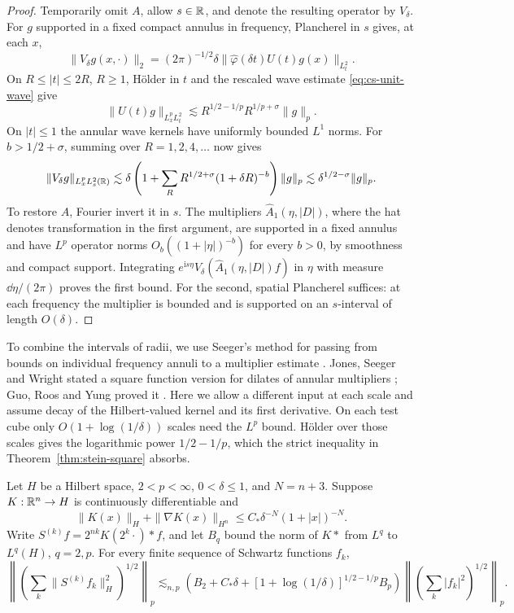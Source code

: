 \begin{proof}
Temporarily omit \(A\), allow \(s\in\mathbb R\), and denote the resulting
operator by \(V_\delta\). For \(g\) supported in a fixed compact
annulus in frequency, Plancherel in \(s\) gives, at each \(x\),
\[
 \|V_\delta g(x,\cdot)\|_2
   =(2\pi)^{-1/2}\delta
          \|\widehat\varphi(\delta t) U(t)g(x)\|_{L^2_t}.
\]
On \(R\le |t|\le 2R\), \(R\ge1\), H\"older in \(t\) and the rescaled
wave estimate \eqref{eq:cs-unit-wave} give
\[
 \|U(t)g\|_{L^p_xL^2_t}
 \lesssim R^{1/2-1/p}R^{1/p+\sigma}\|g\|_p.
\]
On \(|t|\le1\) the annular wave kernels have uniformly bounded
\(L^1\) norms. For \(b>1/2+\sigma\), summing over \(R=1,2,4,\ldots\)
now gives
\[
 \|V_\delta g\|_{L^p_x L^2_s(\mathbb R)}
 \lesssim \delta\left(1+\sum_R R^{1/2+\sigma}(1+\delta R)^{-b}\right)
             \|g\|_p
 \lesssim \delta^{1/2-\sigma}\|g\|_p .
\]
To restore \(A\), Fourier invert it in \(s\). The multipliers
\(\widehat A_1(\eta,|D|)\), where the hat denotes transformation in
the first argument, are supported in a fixed annulus and have \(L^p\)
operator norms \(O_b((1+|\eta|)^{-b})\) for every \(b>0\), by smoothness
and compact support. Integrating
\(e^{\mathrm is\eta}V_\delta(\widehat A_1(\eta,|D|)f)\) in \(\eta\)
with measure \(\dd\eta/(2\pi)\) proves the first bound. For the second,
spatial Plancherel suffices: at each frequency the multiplier is bounded
and is supported on an \(s\)-interval of length \(O(\delta)\).
\end{proof}

To combine the intervals of radii, we use Seeger's method for passing
from bounds on individual frequency annuli to a multiplier estimate
\cite[Theorem~1]{Seeger1988Dilates}. Jones, Seeger and Wright stated
a square function version for dilates of annular multipliers
\cite[p.~6737]{JSW2008Dilates}; Guo, Roos and Yung proved it
\cite[Proposition~4.2 and \S7]{GRY2020Dilates}. Here we allow a different
input at each scale and assume decay of the Hilbert-valued kernel and
its first derivative. On each test cube only \(O(1+\log(1/\delta))\)
scales need the \(L^p\) bound. H\"older over those scales gives the
logarithmic power \(1/2-1/p\), which the strict inequality in
Theorem~\ref{thm:stein-square} absorbs.

\begin{lemma}\label{lem:square-dilates}
Let \(H\) be a Hilbert space, \(2<p<\infty\), \(0<\delta\le1\), and
\(N=n+3\). Suppose \(K:\mathbb R^n\to H\) is continuously differentiable and
\[
 \|K(x)\|_H+\|\nabla K(x)\|_{H^n}
             \le C_*\delta^{-N}(1+|x|)^{-N}.
\]
Write \(S^{(k)}f=2^{nk}K(2^k\cdot)*f\), and let \(B_q\) bound the norm
of \(K*\) from \(L^q\) to \(L^q(H)\), \(q=2,p\). For every finite
sequence of Schwartz functions \(f_k\),
\[
 \left\|\left(\sum_k\|S^{(k)}f_k\|_H^2\right)^{1/2}\right\|_p
 \lesssim_{n,p}
 \left(B_2+C_*\delta+[1+\log(1/\delta)]^{1/2-1/p}B_p\right)
 \left\|\left(\sum_k|f_k|^2\right)^{1/2}\right\|_p .
\]
\end{lemma}

